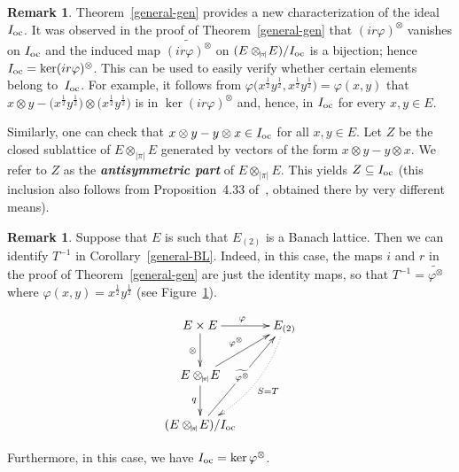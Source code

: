 \documentclass[12pt]{amsart}
\theoremstyle{plain}
\theoremstyle{definition}
\newtheorem{remark}[theorem]{Remark}
\newcommand{\abs}[1]{\lvert#1\rvert}
\newcommand{\term}[1]{{\textit{\textbf{#1}}}}
\def\api{{\abs{\!\pi\!}}}
\def\ftp{\otimes_{\!\scriptscriptstyle\api}\!}
\def\xyroot{x^{\frac{1}{2}}{y^{\frac{1}{2}}}}
\def\Ioc{I_{\rm oc}}
\begin{document}
\begin{remark}
  Theorem~\ref{general-gen} provides a new characterization of the
  ideal~$\Ioc$. It was observed in the proof of
  Theorem~\ref{general-gen} that $(ir\varphi)^\otimes$ vanishes on
  $\Ioc$ and the induced map $\widetilde{(ir\varphi)^\otimes}$ on
  $(E\ftp E)/\Ioc$ is a bijection; hence
  $\Ioc=\ker(ir\varphi)^\otimes$. This can be used to easily verify
  whether certain elements belong to~$\Ioc$. For example, it
  follows from $\varphi\bigl(\xyroot,\xyroot\bigr)=\varphi(x,y)$ that
   \begin{math}
     x\otimes y-\bigl(\xyroot\bigr)\otimes\bigl(\xyroot\bigr)
   \end{math}
  is in $\ker(ir\varphi)^\otimes$ and, hence, in $\Ioc$ for every
  $x,y\in E$.

  Similarly, one can check that $x\otimes y-y\otimes x\in\Ioc$ for all
  $x,y\in E$. Let $Z$ be the closed sublattice of $E\ftp E$ generated
  by vectors of the form $x\otimes y-y\otimes x$. We refer to $Z$ as
  the \term{antisymmetric part} of $E\ftp E$. This yields
  $Z\subseteq\Ioc$ (this inclusion also follows from Proposition~4.33
  of~\cite{Loane:thesis}, obtained there by very different means).
\end{remark}


\begin{remark}\label{Ioc-m}
  Suppose that $E$ is such that $E_{(2)}$ is a Banach lattice. Then we
  can identify $T^{-1}$ in Corollary~\ref{general-BL}.  Indeed, in
  this case, the maps $i$ and $r$ in the proof of
  Theorem~\ref{general-gen} are just the identity maps, so that
  $T^{-1}=\widetilde{\varphi^\otimes}$ where $\varphi(x,y)=\xyroot$
  (see Figure~\ref{diagram}).
  \begin{figure}[!htb]\caption{}\label{diagram}
     \[\xymatrix{
     E\times E \ar[r]^\varphi \ar[d]_{\otimes}  & E_{(2)} \ar@{.>}@/^1pc/[ddl]^{S=T}\\
     E\ftp E \ar[ur]^{\varphi^{\otimes}} \ar[d]_q &\\
     (E\ftp E)/\Ioc \ar[uur]|*+<4pt>{\scriptstyle{\widetilde{\varphi^\otimes}}} &
     }
     \]
  \end{figure}
   Furthermore, in this case, we have
  $\Ioc=\ker \varphi^\otimes$.
\end{remark}
\end{document}
